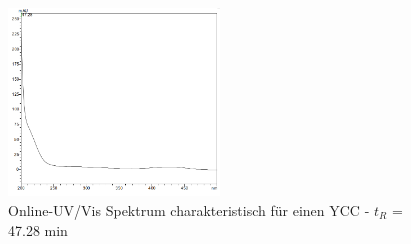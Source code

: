 \begin{figure}[!htbp]
  \centering
  \includegraphics[width=0.5\textwidth]{figures/Kapitel6/Reaktion3h/YCC4728.png}
  \caption{}
  \label{fig:YCC4728}
  \caption[Online-UV/Vis Spektren mit der Charakteristik eines YCC bei 47.28 min, Quelle: Autor]{Online-UV/Vis Spektrum charakteristisch für einen  \gls{YCC} - $t_R$ = 47.28 min}
\end{figure}

